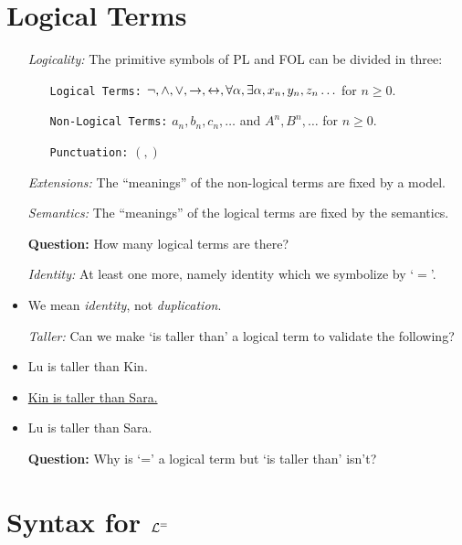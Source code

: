 \documentclass[a4paper, 11pt]{article} %
\begin{document}
\section*{Logical Terms}

\begin{itemize}
  \item[\it Logicality:] The primitive symbols of PL and FOL can be divided in three:
    \begin{itemize}
      \item[\tt Logical Terms:] $\neg,\wedge,\vee,\rightarrow,\leftrightarrow,\forall\alpha,\exists\alpha,x_n,y_n,z_n\ldots$ for $n\geq 0$.
      \item[\tt Non-Logical Terms:] $a_n,b_n,c_n,\ldots$ and $A^n,B^n,\ldots$ for $n\geq 0$.
      \item[\tt Punctuation:] $(, )$
    \end{itemize}
  \item[\it Extensions:] The ``meanings'' of the non-logical terms are fixed by a model.
  \item[\it Semantics:] The ``meanings'' of the logical terms are fixed by the semantics.
  \item[\bf Question:] How many logical terms are there?
  \item[\it Identity:] At least one more, namely identity which we symbolize by `$=$'.
    \item We mean \textit{identity}, not \textit{duplication}.
  \item[\it Taller:] Can we make `is taller than' a logical term to validate the following?
    \setcounter{enumi}{0}
    \item Lu is taller than Kin.
    \item \underline{Kin is taller than Sara.\quad\quad}
    \item Lu is taller than Sara.
    \item[\bf Question:] Why is `=' a logical term but `is taller than' isn't?
\end{itemize}





\section*{Syntax for $\mathcal{L}^=$}
\end{document}
